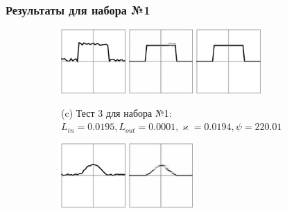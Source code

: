 \documentclass{beamer}
\renewcommand{\kappa}{\varkappa}
\begin{document}
\begin{frame}
		\frametitle{Результаты для набора №1}
		\vspace{-1em}
		\begin{figure}[!hp]
			\centering
			\begin{subfigure}{\textwidth}
				\centering
				\includegraphics[width=0.27\textwidth]{res_n1_5}
				\hfill
				\includegraphics[width=0.27\textwidth]{res_n1_6}
				\hfill
				\includegraphics[width=0.27\textwidth]{3}
				\caption*{\small (c) Тест 3 для набора №1: $L_{in} = 0.0195,
					L_{out} = 0.0001,
					\kappa = 0.0194,
					\psi = 220.01$}
			\end{subfigure}
			\vspace{-1.2em}
			\begin{subfigure}{\textwidth}
				\centering
				\includegraphics[width=0.27\textwidth]{res_n1_7}
				\hfill
				\includegraphics[width=0.27\textwidth]{res_n1_8}

\end{subfigure}
\end{figure}
\end{frame}
\end{document}
